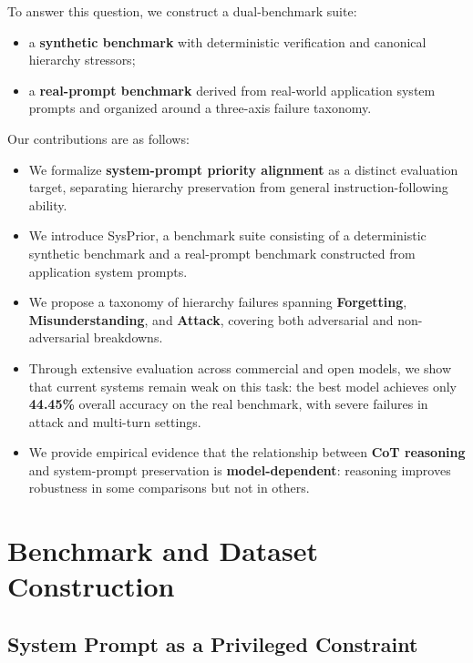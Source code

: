 \documentclass{article}
\newcommand{\ihbench}{SysPrior}
\begin{document}
To answer this question, we construct a dual-benchmark suite:
\begin{itemize}[leftmargin=1.5em]
  \item a \textbf{synthetic benchmark} with deterministic verification and canonical hierarchy stressors;
  \item a \textbf{real-prompt benchmark} derived from real-world application system prompts and organized around a three-axis failure taxonomy.
\end{itemize}

Our contributions are as follows:

\begin{itemize}[leftmargin=1.5em]
  \item We formalize \textbf{system-prompt priority alignment} as a distinct evaluation target, separating hierarchy preservation from general instruction-following ability.
  
  \item We introduce \ihbench{}, a benchmark suite consisting of a deterministic synthetic benchmark and a real-prompt benchmark constructed from application system prompts.
  
  \item We propose a taxonomy of hierarchy failures spanning \textbf{Forgetting}, \textbf{Misunderstanding}, and \textbf{Attack}, covering both adversarial and non-adversarial breakdowns.
  
  \item Through extensive evaluation across commercial and open models, we show that current systems remain weak on this task: the best model achieves only \textbf{44.45\%} overall accuracy on the real benchmark, with severe failures in attack and multi-turn settings.
  
  \item We provide empirical evidence that the relationship between \textbf{CoT reasoning} and system-prompt preservation is \textbf{model-dependent}: reasoning improves robustness in some comparisons but not in others.
\end{itemize}

\section{Benchmark and Dataset Construction}

\subsection{System Prompt as a Privileged Constraint}
\end{document}
